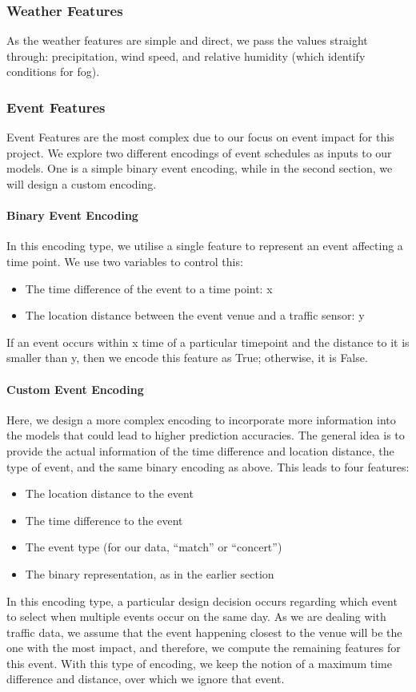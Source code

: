\subsubsection{Weather Features}
As the weather features are simple and direct, we pass the values straight through: precipitation, wind speed, and relative humidity (which identify conditions for fog).

\subsubsection{Event Features}
Event Features are the most complex due to our focus on event impact for this project. We explore two different encodings of event schedules as inputs to our models. One is a simple binary event encoding, while in the second section, we will design a custom encoding.

\paragraph{Binary Event Encoding}
In this encoding type, we utilise a single feature to represent an event affecting a time point. We use two variables to control this:
\begin{itemize}
    \item The time difference of the event to a time point: x
    \item The location distance between the event venue and a traffic sensor: y
\end{itemize}
If an event occurs within x time of a particular timepoint and the distance to it is smaller than y, then we encode this feature as True; otherwise, it is False.

\paragraph{Custom Event Encoding}
Here, we design a more complex encoding to incorporate more information into the models that could lead to higher prediction accuracies. The general idea is to provide the actual information of the time difference and location distance, the type of event, and the same binary encoding as above. This leads to four features:
\begin{itemize}
    \item The location distance to the event
    \item The time difference to the event
    \item The event type (for our data, “match” or “concert”)
    \item The binary representation, as in the earlier section
\end{itemize}
In this encoding type, a particular design decision occurs regarding which event to select when multiple events occur on the same day. As we are dealing with traffic data, we assume that the event happening closest to the venue will be the one with the most impact, and therefore, we compute the remaining features for this event. With this type of encoding, we keep the notion of a maximum time difference and distance, over which we ignore that event.

